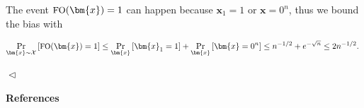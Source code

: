 The event ${\textrm{\small{FO}}}(\bm{x})=1$ can happen because $\bm{x}_{1}=1$ or $\bm{x}=0^{n}$, thus we bound the bias with\par


\[\begin{gathered}
\Pr_{\bm{x}\sim\mathcal{X}}\left[{\textrm{\small{FO}}}(\bm{x})=1\right]\leq\Pr_{\bm{x}}\left[\bm{x}_{1}=1\right]+\Pr_{\bm{x}}\left[\bm{x}=0^{n}\right]\leq n^{-1/2}+e^{-\sqrt{n}}\leq 2n^{-1/2}.\
\end{gathered}\]


$\vartriangleleft$\par






\par\medskip\noindent\textbf{References}\par



